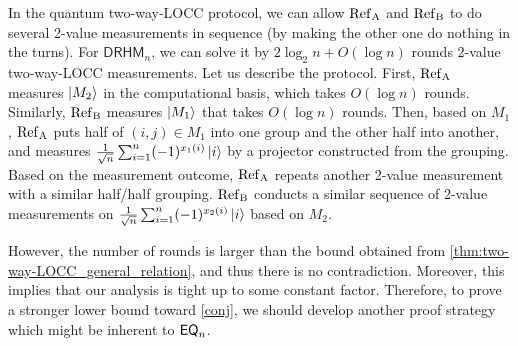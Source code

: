 \begin{remark}\label{remark}
    In the quantum two-way-LOCC protocol, we can allow $\rm{Ref}_A$ and $\rm{Ref}_B$ to do several 2-value measurements in sequence (by making the other one do nothing in the turns). For $\mathsf{DRHM}_n$, we can solve it by $2 \log_2 n + O(\log n)$ rounds 2-value two-way-LOCC measurements. Let us describe the protocol. First, $\rm{Ref}_A$ measures $\ket{M_2}$ in the computational basis, which takes $O(\log n)$ rounds. Similarly, $\rm{Ref}_B$ measures $\ket{M_1}$ that takes $O(\log n)$ rounds. Then, based on $M_1$,  $\rm{Ref}_A$ puts half of ${(i,j) \in M_1}$ into one group and the other half into another, and measures $\frac{1}{\sqrt{n}} \sum_{i=1}^n (-1)^{x_{1}(i)} \ket{i}$ by a projector constructed from the grouping. Based on the measurement outcome, $\rm{Ref}_A$ repeats another 2-value measurement with a similar half/half grouping. $\rm{Ref}_B$ conducts a similar sequence of 2-value measurements on $\frac{1}{\sqrt{n}} \sum_{i=1}^n (-1)^{x_{2}(i)} \ket{i}$ based on $M_2$.

    However, the number of rounds is larger than the bound obtained from \cref{thm:two-way-LOCC_general_relation}, and thus there is no contradiction. Moreover, this implies that our analysis is tight up to some constant factor. Therefore, to prove a stronger lower bound toward \cref{conj}, we should develop another proof strategy which might be inherent to $\mathsf{EQ}_n$.
\end{remark}
